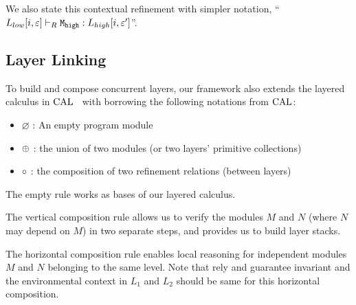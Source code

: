 {\noindent}We also state this contextual refinement with simpler notation, 
``$\ltyp{\PLayer{L_{low}}{i}{\oracle}}{R}{\codeinmath{M}_{\codeinmath{high}}}{\PLayer{L_{high}}{i}{\oracle'}}$''. 



\subsection{Layer Linking}
\label{chapter:ccal:subsec:linking}


To build and compose concurrent layers, 
our framework also extends the layered calculus in $\calname$~\cite{deepspec} with 
borrowing the following notations 
from $\calname$:
\begin{itemize}
\item $\varnothing$ : An  empty program module
\item $\modulecomposekwd$ : the union of two modules (or two layers' primitive collections)
\item $\relcomposekwd$ : the composition of two refinement relations (between layers)
\end{itemize}

The empty rule works as bases of our layered calculus.
 \begin{mathpar}
\end{mathpar}

The vertical composition rule allows us
to verify the modules $M$ and $N$ (where $N$ may depend on $M$) 
in two separate steps, and provides us to build layer stacks.
    \begin{mathpar}
\end{mathpar}

The horizontal composition rule enables local reasoning for independent
modules $M$ and $N$ belonging to the same level. Note that rely and guarantee invariant and the environmental context in $L_1$ and $L_2$ should 
be same for this horizontal composition.
 \begin{mathpar}
\end{mathpar}


